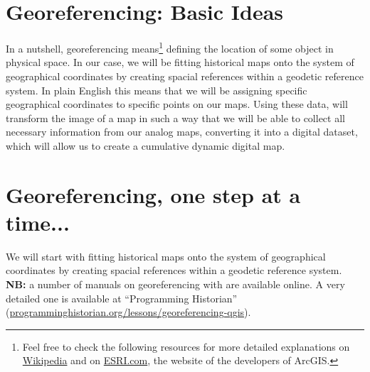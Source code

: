 \documentclass[12pt,oneside]{article}
\begin{document}
\section{Georeferencing: Basic Ideas}
In a nutshell, georeferencing means\footnote{Feel free to check the following resources for more detailed explanations on \href{http://en.wikipedia.org/wiki/Georeference}{Wikipedia} and on \href{http://webhelp.esri.com/arcgisdesktop/9.2/index.cfm?TopicName=Georeferencing_a_raster_dataset}{ESRI.com}, the website of the developers of ArcGIS.} defining the location of some object in physical space. In our case, we will be fitting historical maps onto the system of geographical coordinates by creating spacial references within a geodetic reference system. In plain English this means that we will be assigning specific geographical coordinates to specific points on our maps. Using these data, \QGIS will transform the image of a map in such a way that we will be able to collect all necessary information from our analog maps, converting it into a digital dataset, which will allow us to create a cumulative dynamic digital map.

\section{Georeferencing, one step at a time...}
We will start with fitting historical maps onto the system of geographical coordinates by creating spacial references within a geodetic reference system. \textbf{NB:} a number of manuals on georeferencing with \QGIS are available online. A very detailed one is available at ``Programming Historian'' (\href{http://programminghistorian.org/lessons/georeferencing-qgis}{programminghistorian.org/lessons/georeferencing-qgis}).
\end{document}

